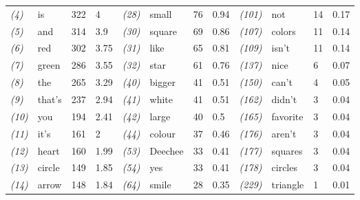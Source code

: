\begin{screenonly}
\begin{table*}[h]
\begin{tabular*}{\hsize}{@{\extracolsep{\fill}}llllllllllll}
    \textsl{(4)} & is & 322 & 4 & \hspace*{2ex}\textsl{(28)} & small & 76 & 0.94 & \hspace*{2ex}\textsl{(101)} & not & 14 & 0.17\\
    \textsl{(5)} & and & 314 & 3.9 & \hspace*{2ex}\textsl{(30)} & square & 69 & 0.86 & \hspace*{2ex}\textsl{(107)} & colors & 11 & 0.14\\
    \textsl{(6)} & red & 302 & 3.75 & \hspace*{2ex}\textsl{(31)} & like & 65 & 0.81 & \hspace*{2ex}\textsl{(109)} & isn't & 11 & 0.14\\
    \textsl{(7)} & green & 286 & 3.55 & \hspace*{2ex}\textsl{(32)} & star & 61 & 0.76 & \hspace*{2ex}\textsl{(137)} & nice & 6 & 0.07\\
    \textsl{(8)} & the & 265 & 3.29 & \hspace*{2ex}\textsl{(40)} & bigger & 41 & 0.51 & \hspace*{2ex}\textsl{(150)} & can't & 4 & 0.05\\
    \textsl{(9)} & that's & 237 & 2.94 & \hspace*{2ex}\textsl{(41)} & white & 41 & 0.51 & \hspace*{2ex}\textsl{(162)} & didn't & 3 & 0.04\\
    \textsl{(10)} & you & 194 & 2.41 & \hspace*{2ex}\textsl{(42)} & large & 40 & 0.5 & \hspace*{2ex}\textsl{(165)} & favorite & 3 & 0.04\\
    \textsl{(11)} & it's & 161 & 2 & \hspace*{2ex}\textsl{(44)} & colour & 37 & 0.46 & \hspace*{2ex}\textsl{(176)} & aren't & 3 & 0.04\\
    \textsl{(12)} & heart & 160 & 1.99 & \hspace*{2ex}\textsl{(53)} & Deechee & 33 & 0.41 & \hspace*{2ex}\textsl{(177)} & squares & 3 & 0.04\\
    \textsl{(13)} & circle & 149 & 1.85 & \hspace*{2ex}\textsl{(54)} & yes & 33 & 0.41 & \hspace*{2ex}\textsl{(178)} & circles & 3 & 0.04\\
    \textsl{(14)} & arrow & 148 & 1.84 & \hspace*{2ex}\textsl{(64)} & smile & 28 & 0.35 & \hspace*{2ex}\textsl{(229)} & triangle & 1 & 0.01\\

\end{tabular*}
\end{table*}
\end{screenonly}
